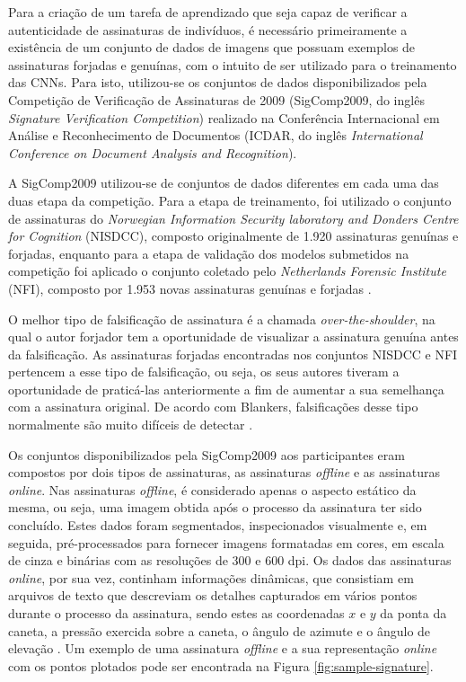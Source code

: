 Para a criação de um tarefa de aprendizado que seja capaz de verificar a autenticidade de assinaturas de indivíduos, é necessário primeiramente a existência de um conjunto de dados de imagens que possuam exemplos de assinaturas forjadas e genuínas, com o intuito de ser utilizado para o treinamento das CNNs. Para isto, utilizou-se os conjuntos de dados disponibilizados pela Competição de Verificação de Assinaturas de 2009 (SigComp2009, do inglês \emph{Signature Verification Competition}) realizado na Conferência Internacional em Análise e Reconhecimento de Documentos (ICDAR, do inglês \emph{International Conference on Document Analysis and Recognition}).

A SigComp2009 utilizou-se de conjuntos de dados diferentes em cada uma das duas etapa da competição. Para a etapa de treinamento, foi utilizado o conjunto de assinaturas do \emph{Norwegian Information Security laboratory and Donders Centre for Cognition} (NISDCC), composto originalmente de 1.920 assinaturas genuínas e forjadas, enquanto para a etapa de validação dos modelos submetidos na competição foi aplicado o conjunto coletado pelo \emph{Netherlands Forensic Institute} (NFI), composto por 1.953 novas assinaturas genuínas e forjadas \cite{icdar2009}.


O melhor tipo de falsificação de assinatura é a chamada \emph{over-the-shoulder}, na qual o autor forjador tem a oportunidade de visualizar a assinatura genuína antes da falsificação. As assinaturas forjadas encontradas nos conjuntos NISDCC e NFI pertencem a esse tipo de falsificação, ou seja, os seus autores tiveram a oportunidade de praticá-las anteriormente a fim de aumentar a sua semelhança com a assinatura original. De acordo com Blankers, falsificações desse tipo normalmente são muito difíceis de detectar \cite{icdar2009}.

Os conjuntos disponibilizados pela SigComp2009 aos participantes eram compostos por dois tipos de assinaturas, as assinaturas \emph{offline} e as assinaturas \emph{online}. Nas assinaturas \emph{offline}, é considerado apenas o aspecto estático da mesma, ou seja, uma imagem obtida após o processo da assinatura ter sido concluído. Estes dados foram segmentados, inspecionados visualmente e, em seguida, pré-processados para fornecer imagens formatadas em cores, em escala de cinza e binárias com as resoluções de 300 e 600 dpi. Os dados das assinaturas \emph{online}, por sua vez, continham informações dinâmicas, que consistiam em arquivos de texto que descreviam os detalhes capturados em vários pontos durante o processo da assinatura, sendo estes as coordenadas $x$ e $y$ da ponta da caneta, a pressão exercida sobre a caneta, o ângulo de azimute e o ângulo de elevação \cite{icdar2009}. Um exemplo de uma assinatura \emph{offline} e a sua representação \emph{online} com os pontos plotados pode ser encontrada na Figura \ref{fig:sample-signature}.


